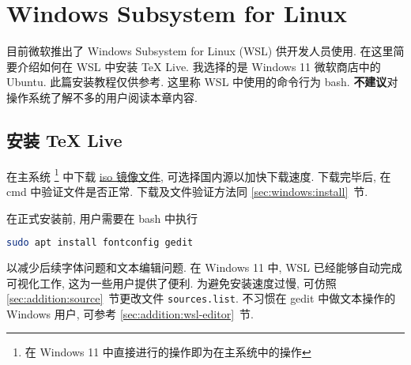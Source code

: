 
\chapter{Windows Subsystem for Linux}

目前微软推出了 Windows Subsystem for Linux (WSL) 供开发人员使用.
在这里简要介绍如何在 WSL 中安装 \TeX{} Live.
我选择的是 Windows 11 微软商店中的 Ubuntu.
此篇安装教程仅供参考.
这里称 WSL 中使用的命令行为 \textsf{bash}.
\textbf{不建议}对操作系统了解不多的用户阅读本章内容.

\section{安装 \TeX{} Live}

在主系统%
\footnote{在 Windows 11 中直接进行的操作即为在主系统中的操作}%
中下载
\href{https://mirrors.ctan.org/systems/texlive/Images/texlive2024.iso}{iso 镜像文件},
可选择国内源以加快下载速度.
下载完毕后, 在 \textsf{cmd} 中验证文件是否正常.
下载及文件验证方法同 \ref{sec:windows:install}~节.

在正式安装前,
用户需要在 \textsf{bash} 中执行
\begin{lstlisting}[language=bash]
  sudo apt install fontconfig gedit
\end{lstlisting}
以减少后续字体问题和文本编辑问题.
在 Windows 11 中,
WSL 已经能够自动完成可视化工作,
这为一些用户提供了便利.
为避免安装速度过慢,
可仿照 \ref{sec:addition:source}~节更改文件 \texttt{sources.list}.
不习惯在 \textsf{gedit} 中做文本操作的 Windows 用户,
可参考 \ref{sec:addition:wsl-editor}~节.

